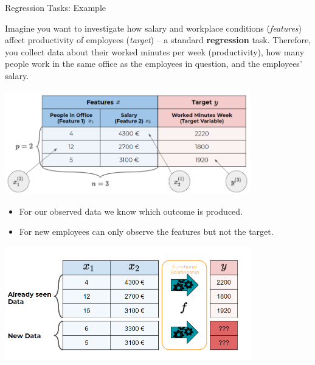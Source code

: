 \documentclass[11pt,compress,t,notes=noshow, xcolor=table]{beamer}
\begin{document}

\begin{vbframe}{Regression Tasks: Example}

Imagine you want to investigate how salary and workplace conditions 
(\emph{features}) affect productivity of employees (\emph{target}) -- a standard 
\textbf{regression} task. Therefore, you collect data about their worked minutes 
per week (productivity), how many people work in the same office as the 
employees in question, and the employees' salary.
  
\begin{center}
  \includegraphics[width = 0.8\textwidth]{figure_man/data_table} 
\end{center}

\framebreak

\begin{itemize}

  \item For our observed data we know which outcome is produced.
  
  \item For new employees can only observe the features but not the target.

\end{itemize}

\begin{center}
  \includegraphics[width=0.8\textwidth]{figure_man/what_is_a_model_web} 
\end{center}

\end{vbframe}
\end{document}
